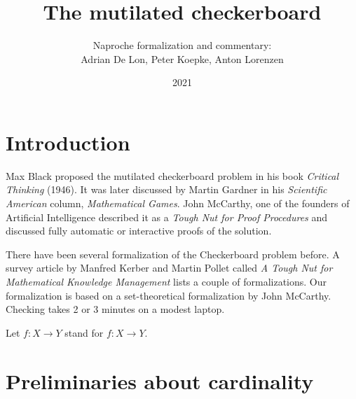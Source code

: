 \documentclass[english]{article}
\title{The mutilated checkerboard}
\author{Naproche formalization and commentary:\\ Adrian De Lon, Peter Koepke, Anton Lorenzen}
\date{2021}
\begin{document}
\maketitle





\section{Introduction}

Max Black proposed the mutilated checkerboard problem in his book
\textit{Critical Thinking} (1946).
%
It was later discussed by Martin Gardner in his
\textit{Scientific American} column, \textit{Mathematical Games}.
%
John McCarthy, one of the
founders of Artificial Intelligence described it as a
\textit{Tough Nut for Proof Procedures}
and discussed fully automatic or interactive proofs of the solution.

There have been several formalization of the Checkerboard problem before. A
survey article by Manfred Kerber and Martin Pollet called \emph{A Tough Nut
for Mathematical Knowledge Management} lists a couple of formalizations.
Our formalization is based on a set-theoretical formalization by John McCarthy.
Checking takes 2 or 3 minutes on a modest laptop.


    \begin{forthel}

        Let $f : X\to Y$ stand for $f : X\rightarrow Y$.
    \end{forthel}


\section{Preliminaries about cardinality}
\end{document}
